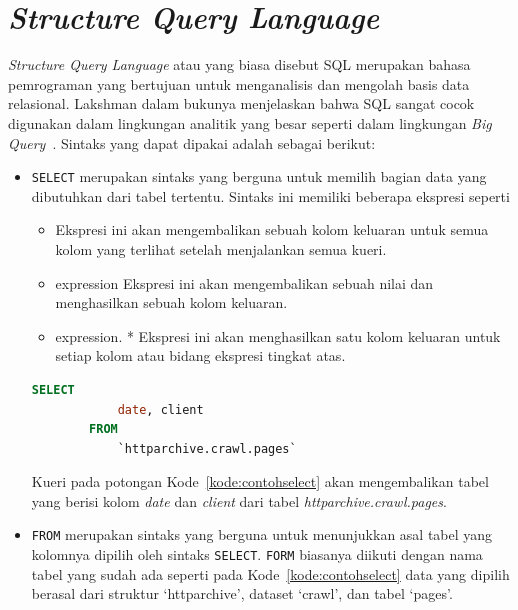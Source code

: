 \section{\textit{Structure Query Language}}
\label{sec:sql} 
\textit{Structure Query Language} atau yang biasa disebut SQL merupakan bahasa pemrograman yang bertujuan untuk menganalisis dan mengolah basis data relasional. Lakshman dalam bukunya menjelaskan bahwa SQL sangat cocok digunakan dalam lingkungan analitik yang besar seperti dalam lingkungan \textit{Big Query}~\cite{book:SQLBigQuery}. Sintaks yang dapat dipakai adalah sebagai berikut:
\begin{itemize}
    \item \verb|SELECT| merupakan sintaks yang berguna untuk memilih bagian data yang dibutuhkan dari tabel tertentu. Sintaks ini memiliki beberapa ekspresi seperti 
    \begin{itemize}
        \item \* Ekspresi ini akan mengembalikan sebuah kolom keluaran untuk semua kolom yang terlihat setelah menjalankan semua kueri.
        \item expression Ekspresi ini akan mengembalikan sebuah nilai dan menghasilkan sebuah kolom keluaran.
        \item expression. * Ekspresi ini akan menghasilkan satu kolom keluaran untuk setiap kolom atau bidang ekspresi tingkat atas.
    \end{itemize}
    \begin{lstlisting}[language=SQL, caption=contoh penggunaan sintaks \lstinline|SELECT|, label=kode:contohselect]
        SELECT
            date, client
        FROM
            `httparchive.crawl.pages`
    \end{lstlisting}
    Kueri pada potongan Kode~\ref{kode:contohselect} akan mengembalikan tabel yang berisi kolom \textit{date} dan \textit{client} dari tabel \textit{httparchive.crawl.pages}.

    \item \verb|FROM| merupakan sintaks yang berguna untuk menunjukkan asal tabel yang kolomnya dipilih oleh sintaks \verb|SELECT|. \verb|FORM| biasanya diikuti dengan nama tabel yang sudah ada seperti pada Kode~\ref{kode:contohselect} data yang dipilih berasal dari struktur `httparchive', dataset `crawl', dan tabel `pages'.
    

\end{itemize}
